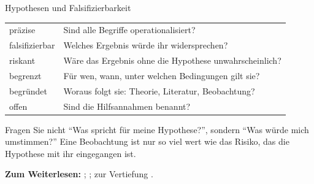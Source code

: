 \begin{handout}{Hypothesen und Falsifizierbarkeit}
\begin{center}
\small
\begin{tabular}{p{}p{}}
\toprule
präzise & Sind alle Begriffe operationalisiert? \\
falsifizierbar & Welches Ergebnis würde ihr widersprechen? \\
riskant & Wäre das Ergebnis ohne die Hypothese unwahrscheinlich? \\
begrenzt & Für wen, wann, unter welchen Bedingungen gilt sie? \\
begründet & Woraus folgt sie: Theorie, Literatur, Beobachtung? \\
offen & Sind die Hilfsannahmen benannt? \\
\bottomrule
\end{tabular}
\end{center}

\begin{merkbox}
Fragen Sie nicht \enquote{Was spricht für meine Hypothese?}, sondern
\enquote{Was würde mich umstimmen?} Eine Beobachtung ist nur so viel wert
wie das Risiko, das die Hypothese mit ihr eingegangen ist.
\end{merkbox}

\textbf{Zum Weiterlesen:} \textcite{popper1934logik};
\textcite{wason1960failure}; zur Vertiefung
\textcite{horwich1982probability}.
\end{handout}

